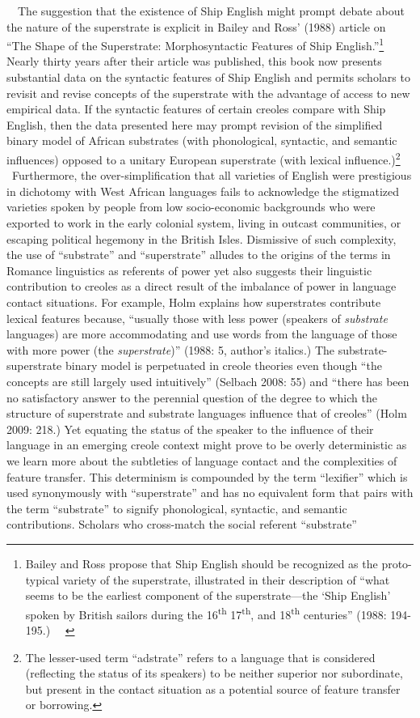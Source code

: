 \begin{styleStandard}
\ \ The suggestion that the existence of Ship English might prompt debate about the nature of the superstrate is explicit in Bailey and Ross’ (1988) article on “The Shape of the Superstrate: Morphosyntactic Features of Ship English.”\footnote{ Bailey and Ross propose that Ship English should be recognized as the proto-typical variety of the superstrate, illustrated in their description of “what seems to be the earliest component of the superstrate—the ‘Ship English’ spoken by British sailors during the 16\textsuperscript{th} 17\textsuperscript{th}, and 18\textsuperscript{th} centuries” (1988: 194-195.) \ \ } Nearly thirty years after their article was published, this book now presents substantial data on the syntactic features of Ship English and permits scholars to revisit and revise concepts of the superstrate with the advantage of access to new empirical data. If the syntactic features of certain creoles compare with Ship English, then the data presented here may prompt revision of the simplified binary model of African substrates (with phonological, syntactic, and semantic influences) opposed to a unitary European superstrate (with lexical influence.)\footnote{ The lesser-used term “adstrate” refers to a language that is considered (reflecting the status of its speakers) to be neither superior nor subordinate, but present in the contact situation as a potential source of feature transfer or borrowing.} \ Furthermore, the over-simplification that all varieties of English were prestigious in dichotomy with West African languages fails to acknowledge the stigmatized varieties spoken by people from low socio-economic backgrounds who were exported to work in the early colonial system, living in outcast communities, or escaping political hegemony in the British Isles. Dismissive of such complexity, the use of “substrate” and “superstrate” alludes to the origins of the terms in Romance linguistics as referents of power yet also suggests their linguistic contribution to creoles as a direct result of the imbalance of power in language contact situations. For example, Holm explains how superstrates contribute lexical features because, “usually those with less power (speakers of \textit{substrate} languages) are more accommodating and use words from the language of those with more power (the \textit{superstrate})” (1988: 5, author’s italics.) The substrate-superstrate binary model is perpetuated in creole theories even though “the concepts are still largely used intuitively” (Selbach 2008: 55) and “there has been no satisfactory answer to the perennial question of the degree to which the structure of superstrate and substrate languages influence that of creoles” (Holm 2009: 218.) Yet equating the status of the speaker to the influence of their language in an emerging creole context might prove to be overly deterministic as we learn more about the subtleties of language contact and the complexities of feature transfer. This determinism is compounded by the term “lexifier” which is used synonymously with “superstrate” and has no equivalent form that pairs with the term “substrate” to signify phonological, syntactic, and semantic contributions. Scholars who cross-match the social referent “substrate” 
\end{styleStandard}
